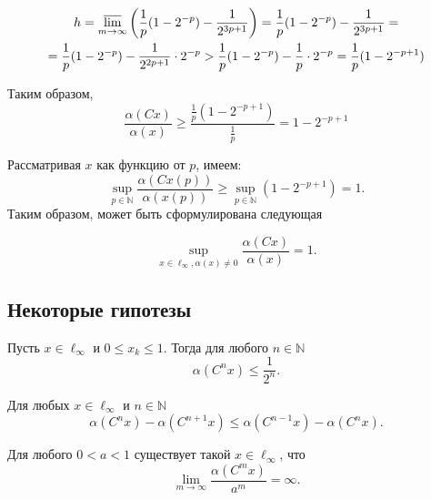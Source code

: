 \begin{multline*}
	h=
	\varlimsup_{m\to \infty} \left(
		\frac{1}{p} (1-2^{-p})
		- \frac{1}{2^{3p+1}}
	\right) =
	\frac{1}{p} (1-2^{-p})
	- \frac{1}{2^{3p+1}}
	= \\ =
	\frac{1}{p} (1-2^{-p})
	- \frac{1}{2^{2p+1}} \cdot 2^{-p}
	>
	\frac{1}{p} (1-2^{-p})
	- \frac{1}{p} \cdot 2^{-p}
	=
	\frac{1}{p} (1-2^{-p+1})
\end{multline*}


Таким образом,
$$
	\frac{\alpha(Cx)}{\alpha(x)} \geq
	\frac{	\frac{1}{p} (1-2^{-p+1}) }{\frac{1}{p}} =
	1-2^{-p+1}
$$

Рассматривая $x$ как функцию от $p$, имеем:
$$
	\sup_{p\in\mathbb{N}} \frac{\alpha(Cx(p))}{\alpha(x(p))} \geq
	\sup_{p\in\mathbb{N}} (1-2^{-p+1}) =
	1
	.
$$
Таким образом, может быть сформулирована следующая

\begin{theorem}
	\label{thm:alpha_Cx_no_gamma}
	\begin{equation}
		\sup_{x\in\ell_\infty, \alpha(x)\neq 0} \frac{\alpha(Cx)}{\alpha(x)}=1
		.
	\end{equation}
\end{theorem}

\subsection{Некоторые гипотезы}

\begin{hypothesis}
	Пусть $x\in\ell_\infty$ и $0 \leq x_k \leq 1$.
	Тогда для любого $n\in\mathbb{N}$
	\begin{equation}
		\alpha(C^n x) \leq \frac{1}{2^n}
		.
	\end{equation}
\end{hypothesis}

\begin{hypothesis}
	Для любых $x\in\ell_\infty$ и $n\in\mathbb{N}$
	\begin{equation}
		\alpha(C^n x) - \alpha(C^{n+1} x) \leq \alpha(C^{n-1} x) - \alpha(C^{n} x)
		.
	\end{equation}
\end{hypothesis}

\begin{hypothesis}
	Для любого $0<a<1$ существует такой $x\in\ell_\infty$, что
	\begin{equation}
		\lim_{m\to\infty} \frac{\alpha(C^m x)}{a^m} = \infty
		.
	\end{equation}
\end{hypothesis}
